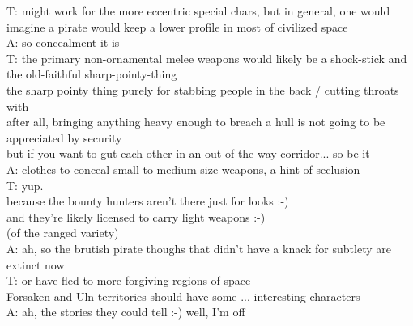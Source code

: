 T: might work for the more eccentric special chars, but in general, one would imagine a pirate would keep a lower profile in most of civilized space\\
A: so concealment it is\\
T: the primary non-ornamental melee weapons would likely be a shock-stick and the old-faithful sharp-pointy-thing\\
the sharp pointy thing purely for stabbing people in the back / cutting throats with\\
after all, bringing anything heavy enough to breach a hull is not going to be appreciated by security\\
but if you want to gut each other in an out of the way corridor... so be it\\
A: clothes to conceal small to medium size weapons, a hint of seclusion\\
T: yup.\\
because the bounty hunters aren't there just for looks :-)\\
and they're likely licensed to carry light weapons :-)\\
(of the ranged variety)\\
A: ah, so the brutish pirate thoughs that didn't have a knack for subtlety are extinct now\\
T: or have fled to more forgiving regions of space\\
Forsaken and Uln territories should have some ... interesting characters\\
A: ah, the stories they could tell :-) well, I'm off\\

